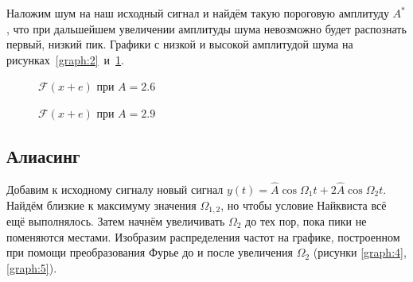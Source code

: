 \documentclass[12pt, a4paper]{article}
\begin{document}
Наложим шум на наш исходный сигнал и найдём такую пороговую амплитуду $A^*$, что при дальшейшем увеличении амплитуды шума невозможно будет распознать первый, низкий пик. Графики с низкой и высокой амплитудой шума на рисунках~\ref{graph:2}~и~\ref{graph:3}.

\begin{figure}[h]
\begin{minipage}{0.45\textwidth}
    \caption{\label{graph:2}$\mathcal{F}(x + e)$ при $A = 2.6$}
\end{minipage} \hfill
\begin{minipage}{0.45\textwidth}
    \caption{\label{graph:3}$\mathcal{F}(x + e)$ при $A = 2.9$}
\end{minipage}
\end{figure}

\subsection*{Алиасинг}

Добавим к исходному сигналу новый сигнал $y(t) = \hat{A} \cos{\Omega_1 t} + 2 \hat{A} \cos{\Omega_2 t}$. 
Найдём близкие к максимуму значения $\Omega_{1,2}$, но чтобы условие Найквиста всё ещё выполнялось. 
Затем начнём увеличивать $\Omega_2$ до тех пор, пока пики не поменяются местами. 
Изобразим распределения частот на графике, построенном при помощи преобразования Фурье до и после увеличения $\Omega_2$ (рисунки \ref{graph:4}, \ref{graph:5}).
\end{document}
